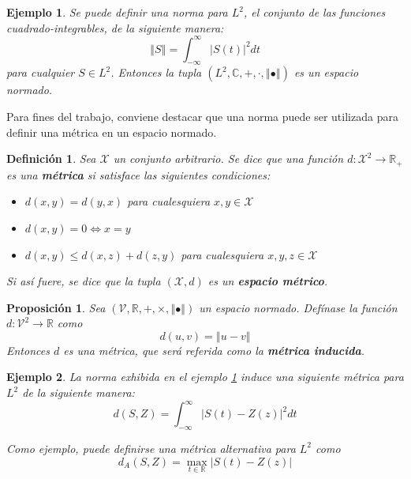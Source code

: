 \documentclass[12pt,letterpaper]{book}
\newtheorem{definicion}{Definición}[chapter]
\newtheorem{proposicion}[teorema]{Proposición}
\newtheorem{ejemplo}{Ejemplo}[chapter]
\newcommand{\R}{\mathbb{R}}
\newcommand{\C}{\mathbb{C}}
\newcommand{\intR}{\int_{-\infty}^{\infty}}
\newcommand{\abso}[1]{\left| #1 \right|}
\newcommand{\norma}[1]{\left\Vert #1 \right\Vert}
\begin{document}
\begin{ejemplo}
Se puede definir una norma para $L^{2}$, el conjunto de las funciones cuadrado-integrables, de la siguiente manera:
\begin{equation}
\norma{S} = \intR \abso{S(t)}^{2} dt
\end{equation} 
para cualquier $S \in L^{2}$. Entonces la tupla $(L^{2},\C,+,\cdot,\norma{\bullet})$ es un espacio normado.
\label{ejemplo:norma_L2}
\end{ejemplo}

Para fines del trabajo, conviene destacar que una norma puede ser utilizada para definir una métrica en un espacio normado.

\begin{definicion}
Sea $\mathcal{X}$ un conjunto arbitrario. Se dice que una función $d: \mathcal{X}^{2}\rightarrow \R_+$ es una \textbf{métrica} si satisface las siguientes condiciones:
\begin{itemize}
\item $d(x,y) = d(y,x)$ para cualesquiera $x,y \in \mathcal{X}$
\item $d(x,y)=0 \Leftrightarrow x=y$
\item $d(x,y) \leq d(x,z) + d(z,y)$ para cualesquiera $x,y,z \in \mathcal{X}$
\end{itemize}
Si así fuere, se dice que la tupla $(\mathcal{X},d)$ es un \textbf{espacio métrico}.
\end{definicion}

\begin{proposicion}
Sea $(\mathcal{V},\R,+,\times, \norma{\bullet})$ un espacio normado. Defínase la función $d: \mathcal{V}^{2} \rightarrow \R$ como
\begin{equation}
d(u,v) = \norma{u-v}
\end{equation}
Entonces $d$ es una métrica, que será referida como la \textbf{métrica inducida}.
\end{proposicion}

\begin{ejemplo}
La norma exhibida en el ejemplo \ref{ejemplo:norma_L2} induce una siguiente métrica para $L^{2}$ de la siguiente manera:
\begin{equation}
d(S,Z) = \intR \abso{S(t) - Z(z)}^{2} dt
\end{equation}

Como ejemplo, puede definirse una métrica alternativa para $L^{2}$ como
\begin{equation}
d_A(S,Z) = \max_{t \in \R} \abso{S(t) - Z(z)}
\end{equation}
\end{ejemplo}
\end{document}
